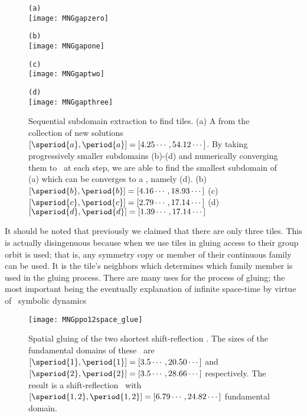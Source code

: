 \begin{description}
{\begin{figure}
\begin{minipage}[height=.2\textheight]{.5\textwidth}
\centering \small{\texttt{(a)}}\\
\texttt{[image: MNGgapzero]}
\end{minipage}
\begin{minipage}[height=.2\textheight]{.5\textwidth}
\centering \small{\texttt{(b)}}\\
\texttt{[image: MNGgapone]}
\end{minipage}
\begin{minipage}[height=.2\textheight]{.5\textwidth}
\centering \small{\texttt{(c)}}\\
\texttt{[image: MNGgaptwo]}
\end{minipage}
\begin{minipage}[height=.2\textheight]{.48\textwidth}
\centering \small{\texttt{(d)}}\\
\texttt{[image: MNGgapthree]}
\end{minipage}
\caption{ \label{fig:KStileextraction}
Sequential subdomain extraction to find tiles.
(a) A {\po} from the collection of new solutions
$[\speriod{a},\period{a}]=[4.25\cdots,54.12\cdots]$.
By taking progressively smaller subdomains (b)-(d) and numerically
converging them to \twots\ at each step, we are able to
find the smallest subdomain of (a) which can be converges
to a \twot, namely (d).
(b)$[\speriod{b},\period{b}]=[4.16\cdots,18.93\cdots]$
(c)$[\speriod{c},\period{c}]=[2.79\cdots,17.14\cdots]$
(d)$[\speriod{d},\period{d}]=[1.39\cdots,17.14\cdots]$
}
\end{figure}

It should be noted that previously we claimed that
there are only three tiles. This is actually disingenuous because when we use tiles
in gluing access to their group orbit is used; that is, any symmetry copy or member
of their continuous family can be used. It is the tile's neighbors which
determines which family member is used in the gluing process.
There are many uses for the process of gluing; the most important being the
eventually explanation of infinite space-time by virtue of \spt\ symbolic
dynamics

\begin{figure}
\centering
\begin{minipage}[height=.4\textheight]{.66\textwidth}
\centering
\texttt{[image: MNGppo12space\_glue]}
\end{minipage}
\caption{ \label{fig:MNGppo12spaceglue}
Spatial gluing of the two shortest shift-reflection
\twots. The sizes of the fundamental domains of these
\twots\ are
$[\speriod{1},\period{1}]=[3.5\cdots,20.50\cdots]$
and
$[\speriod{2},\period{2}]=[3.5\cdots,28.66\cdots]$
respectively.
The result is a
shift-reflection \twot\ with
$[\speriod{1,2},\period{1,2}]=[6.79\cdots,24.82\cdots]$
fundamental domain.
}
\end{figure}


}
\end{description}
